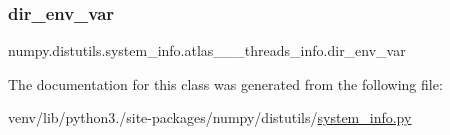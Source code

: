 \subsubsection{\texorpdfstring{dir\+\_\+env\+\_\+var}{dir\_env\_var}}
{\footnotesize\ttfamily numpy.\+distutils.\+system\+\_\+info.\+atlas\+\_\+\_\+\_\+threads\+\_\+info.\+dir\+\_\+env\+\_\+var\hspace{0.3cm}{\ttfamily [static]}}



The documentation for this class was generated from the following file\+:\begin{DoxyCompactItemize}
\item 
venv/lib/python3./site-\/packages/numpy/distutils/\hyperlink{system__info_8py}{system\+\_\+info.\+py}\end{DoxyCompactItemize}
